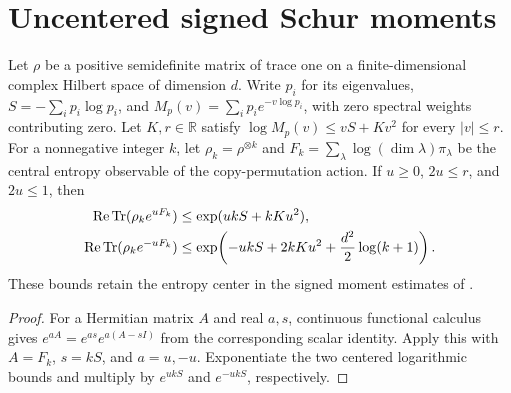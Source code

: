\section{Uncentered signed Schur moments}

\begin{theorem}
  \label{thm:iid_schur_exponential_moments}
  \leanok
  Let $\rho$ be a positive semidefinite matrix of trace one on a
  finite-dimensional complex Hilbert space of dimension $d$.
  Write $p_i$ for its eigenvalues, $S=-\sum_i p_i\log p_i$, and
  $M_p(v)=\sum_i p_i e^{-v\log p_i}$, with zero spectral weights
  contributing zero. Let $K,r\in\mathbb R$ satisfy
  $\log M_p(v)\leq vS+Kv^2$ for every $|v|\leq r$.
  For a nonnegative integer $k$, let $\rho_k=\rho^{\otimes k}$ and
  $F_k=\sum_\lambda\log(\dim\lambda)\pi_\lambda$ be the central
  entropy observable of the copy-permutation action. If $u\geq0$,
  $2u\leq r$, and $2u\leq1$, then
  \begin{align}
    \operatorname{Re}\operatorname{Tr}(\rho_k e^{uF_k})
      &\leq \exp(ukS+kKu^2),\notag\\
    \operatorname{Re}\operatorname{Tr}(\rho_k e^{-uF_k})
      &\leq \exp\!\left(-ukS+2kKu^2+\frac{d^2}{2}\log(k+1)\right).
  \end{align}
  These bounds retain the entropy center in the signed moment estimates
  of \cite[Section~8]{OpenAI2026AreaLaw}.
\end{theorem}
\begin{proof}\leanok
  For a Hermitian matrix $A$ and real $a,s$, continuous functional calculus
  gives $e^{aA}=e^{as}e^{a(A-sI)}$ from the corresponding scalar identity.
  Apply this with $A=F_k$, $s=kS$, and $a=u,-u$.
  Exponentiate the two centered logarithmic bounds and multiply by
  $e^{ukS}$ and $e^{-ukS}$, respectively.
\end{proof}
